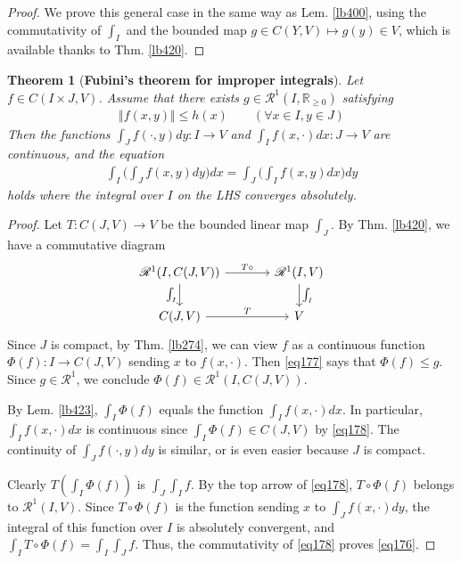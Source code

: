 \documentclass[12pt,b5paper,notitlepage]{article}
\theoremstyle{definition}
\theoremstyle{plain}
\newtheorem{thm}[df]{Theorem}
\newcommand{\scr}{\mathscr}
\newcommand{\Rbb}{\mathbb R}
\numberwithin{equation}{section}
\begin{document}
\begin{proof}
We prove this general case in the same way as Lem. \ref{lb400}, using the commutativity of $\int_I$ and the bounded map $g\in C(Y,V)\mapsto g(y)\in V$, which is available thanks to Thm. \ref{lb420}.
\end{proof}


\begin{thm}[\textbf{Fubini's theorem for improper integrals}] \label{lb422} 
Let $f\in C(I\times J,V)$. Assume that there exists $g\in\scr R^1(I,\Rbb_{\geq0})$ satisfying
\begin{align}
\Vert f(x,y)\Vert\leq h(x)\qquad(\forall x\in I,y\in J)  \label{eq177}
\end{align}
Then the functions $\int_J f(\cdot,y)dy:I\rightarrow V$ and $\int_If(x,\cdot)dx:J\rightarrow V$ are continuous, and the equation
\begin{align}
\int_I\Big(\int_Jf(x,y)dy\Big)dx=\int_J\Big(\int_I f(x,y)dx\Big)dy \label{eq176}
\end{align}
holds where the integral over $I$ on the LHS converges absolutely.
\end{thm}



\begin{proof}
Let $T:C(J,V)\rightarrow V$ be the bounded linear map $\int_J$. By Thm. \ref{lb420}, we have a commutative diagram
\begin{equation}\label{eq178}
\begin{tikzcd}[column sep=large]
\scr R^1(I,C(J,V)) \arrow[r,"T\circ"] \arrow[d,"\int_I"'] & \scr R^1(I,V) \arrow[d,"\int_I"] \\
C(J,V) \arrow[r,"T"]           & V        
\end{tikzcd} 
\end{equation}
Since $J$ is compact, by Thm. \ref{lb274}, we can view $f$ as a continuous function $\Phi(f):I\rightarrow C(J,V)$ sending $x$ to $f(x,\cdot)$. Then \eqref{eq177} says that $\Phi(f)\leq g$. Since $g\in\scr R^1$, we conclude $\Phi(f)\in\scr R^1(I,C(J,V))$. 

By Lem. \ref{lb423}, $\int_I\Phi(f)$ equals the function $\int_I f(x,\cdot)dx$. In particular, $\int_I f(x,\cdot)dx$ is continuous since $\int_I\Phi(f)\in C(J,V)$ by \eqref{eq178}. The continuity of $\int_J f(\cdot,y)dy$ is similar, or is even easier because $J$ is compact.


Clearly $T(\int_I\Phi(f))$ is $\int_J\int_I f$. By the top arrow of \eqref{eq178}, $T\circ\Phi(f)$ belongs to $\scr R^1(I,V)$. Since $T\circ\Phi(f)$ is the function sending $x$ to $\int_J f(x,\cdot)dy$, the  integral of this function over $I$ is absolutely convergent, and $\int_I T\circ\Phi(f)=\int_I\int_Jf$. Thus, the commutativity of \eqref{eq178} proves \eqref{eq176}. 
\end{proof}
\end{document}
